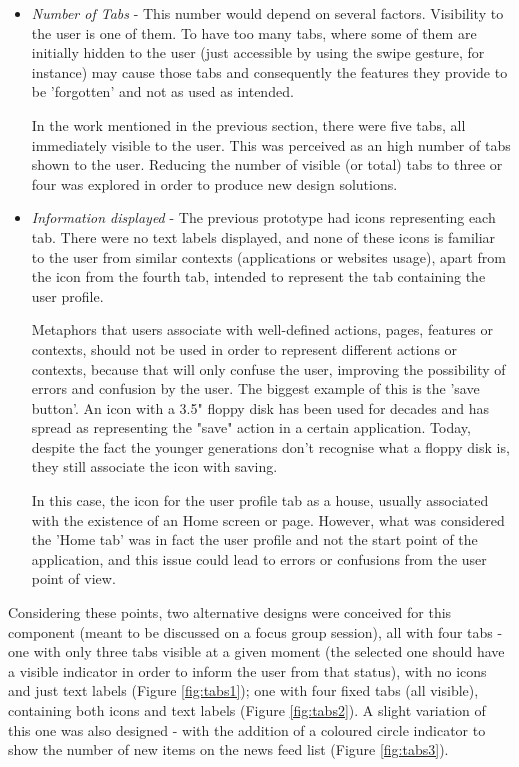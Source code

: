 \begin{itemize}
\item \emph{Number of Tabs} - This number would depend on several factors. Visibility to the user is one of them. To have too many tabs, where some of them are initially hidden to the user (just accessible by using the swipe gesture, for instance) may cause those tabs and consequently the features they provide to be 'forgotten' and not as used as intended. 

In the work mentioned in the previous section, there were five tabs, all immediately visible to the user. This was perceived as an high number of tabs shown to the user. Reducing the number of visible (or total) tabs to three or four was explored in order to produce new design solutions.

\item \emph{Information displayed} - The previous prototype had icons representing each tab. There were no text labels displayed, and none of these icons is familiar to the user from similar contexts (applications or websites usage), apart from the icon from the fourth tab, intended to represent the tab containing the user profile. 

Metaphors that users associate with well-defined actions, pages, features or contexts, should not be used in order to represent different actions or contexts, because that will only confuse the user, improving the possibility of errors and confusion by the user. The biggest example of this is the 'save button'. An icon with a 3.5" floppy disk has been used for decades and has spread as representing the "save" action in a certain application. Today, despite the fact the younger generations don't recognise what a floppy disk is, they still associate the icon with saving.

In this case, the icon for the user profile tab as a house, usually associated with the existence of an Home screen or page. However, what was considered the 'Home tab' was in fact the user profile and not the start point of the application, and this issue could lead to errors or confusions from the user point of view.
\end{itemize}

Considering these points, two alternative designs were conceived for this component (meant to be discussed on a focus group session), all with four tabs - one with only three tabs visible at a given moment (the selected one should have a visible indicator in order to inform the user from that status), with no icons and just text labels (Figure \ref{fig:tabs1}); one with four fixed tabs (all visible), containing both icons and text labels (Figure \ref{fig:tabs2}). A slight variation of this one was also designed - with the addition of a coloured circle indicator to show the number of new items on the news feed list (Figure \ref{fig:tabs3}).

